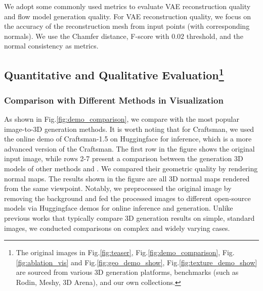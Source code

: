 We adopt some commonly used metrics to evaluate VAE reconstruction quality and flow model generation quality.
For VAE reconstruction quality, we focus on the accuracy of the reconstruction mesh from input points (with corresponding normals). We use the Chamfer distance, F-score with $0.02$ threshold, and the normal consistency as metrics.


\subsection{Quantitative and Qualitative Evaluation\protect\footnote{The original images in Fig.\ref{fig:teaser}, Fig.\ref{fig:demo_comparison}, Fig.\ref{fig:ablation_vis} and Fig.\ref{fig:geo_demo_show}, Fig.\ref{fig:texture_demo_show} are sourced from various 3D generation platforms, benchmarks (such as Rodin, Meshy, 3D Arena), and our own collections.}}


\subsubsection{Comparison with Different Methods in Visualization}
As shown in Fig.\ref{fig:demo_comparison}, we compare \method{} with the most popular image-to-3D generation methods\cite{tochilkin2024triposr, wei2024meshlrm, xu2024instantmesh,wang2024crm, li2024craftsman, DBLP:journals/corr/abs-2408-10198}. It is worth noting that for Craftsman\cite{li2024craftsman}, we used the online demo of Craftsman-1.5 on Huggingface for inference, which is a more advanced version of the Craftsman. 
The first row in the figure shows the original input image, while rows 2-7 present a comparison between the generation 3D models of other methods and \method{}. We compared their geometric quality by rendering normal maps. The results shown in the figure are all 3D normal maps rendered from the same viewpoint.
Notably, we preprocessed the original image by removing the background and fed the processed images to different open-source models via Huggingface demos for online inference and generation. Unlike previous works that typically compare 3D generation results on simple, standard images, we conducted comparisons on complex and widely varying cases.


